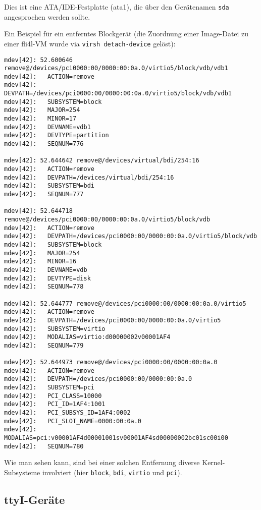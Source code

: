 Dies ist eine ATA/IDE-Festplatte (ata1), die über den Gerätenamen \texttt{sda}
angesprochen werden sollte.

Ein Beispiel für ein entferntes Blockgerät (die Zuordnung einer Image-Datei zu
einer fli4l-VM wurde via \texttt{virsh detach-device} gelöst):

\begin{scriptsize}
\begin{verbatim}
mdev[42]: 52.600646 remove@/devices/pci0000:00/0000:00:0a.0/virtio5/block/vdb/vdb1
mdev[42]:   ACTION=remove
mdev[42]:   DEVPATH=/devices/pci0000:00/0000:00:0a.0/virtio5/block/vdb/vdb1
mdev[42]:   SUBSYSTEM=block
mdev[42]:   MAJOR=254
mdev[42]:   MINOR=17
mdev[42]:   DEVNAME=vdb1
mdev[42]:   DEVTYPE=partition
mdev[42]:   SEQNUM=776

mdev[42]: 52.644642 remove@/devices/virtual/bdi/254:16
mdev[42]:   ACTION=remove
mdev[42]:   DEVPATH=/devices/virtual/bdi/254:16
mdev[42]:   SUBSYSTEM=bdi
mdev[42]:   SEQNUM=777

mdev[42]: 52.644718 remove@/devices/pci0000:00/0000:00:0a.0/virtio5/block/vdb
mdev[42]:   ACTION=remove
mdev[42]:   DEVPATH=/devices/pci0000:00/0000:00:0a.0/virtio5/block/vdb
mdev[42]:   SUBSYSTEM=block
mdev[42]:   MAJOR=254
mdev[42]:   MINOR=16
mdev[42]:   DEVNAME=vdb
mdev[42]:   DEVTYPE=disk
mdev[42]:   SEQNUM=778

mdev[42]: 52.644777 remove@/devices/pci0000:00/0000:00:0a.0/virtio5
mdev[42]:   ACTION=remove
mdev[42]:   DEVPATH=/devices/pci0000:00/0000:00:0a.0/virtio5
mdev[42]:   SUBSYSTEM=virtio
mdev[42]:   MODALIAS=virtio:d00000002v00001AF4
mdev[42]:   SEQNUM=779

mdev[42]: 52.644973 remove@/devices/pci0000:00/0000:00:0a.0
mdev[42]:   ACTION=remove
mdev[42]:   DEVPATH=/devices/pci0000:00/0000:00:0a.0
mdev[42]:   SUBSYSTEM=pci
mdev[42]:   PCI_CLASS=10000
mdev[42]:   PCI_ID=1AF4:1001
mdev[42]:   PCI_SUBSYS_ID=1AF4:0002
mdev[42]:   PCI_SLOT_NAME=0000:00:0a.0
mdev[42]:   MODALIAS=pci:v00001AF4d00001001sv00001AF4sd00000002bc01sc00i00
mdev[42]:   SEQNUM=780
\end{verbatim}
\end{scriptsize}

Wie man sehen kann, sind bei einer solchen Entfernung diverse Kernel-Subsysteme
involviert (hier \texttt{block}, \texttt{bdi}, \texttt{virtio} und
\texttt{pci}).

\subsection{ttyI-Geräte}


